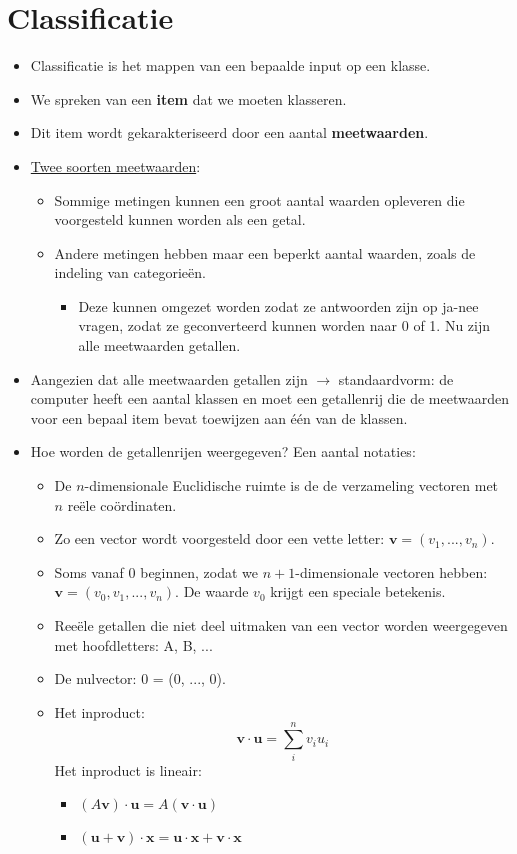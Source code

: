 \section{Classificatie}
\begin{itemize}
	\item Classificatie is het mappen van een bepaalde input op een klasse.
	\item We spreken van een \textbf{item} dat we moeten klasseren.
	\item Dit item wordt gekarakteriseerd door een aantal \textbf{meetwaarden}.
	\item \underline{Twee soorten meetwaarden}:
	\begin{itemize}
		\item Sommige metingen kunnen een groot aantal waarden opleveren die voorgesteld kunnen worden als een getal.
		\item Andere metingen hebben maar een beperkt aantal waarden, zoals de indeling van categorieën. 
		\begin{itemize}
			\item Deze kunnen omgezet worden zodat ze antwoorden zijn op ja-nee vragen, zodat ze geconverteerd kunnen worden naar 0 of 1.
			\good Nu zijn alle meetwaarden getallen.	
		\end{itemize}
	\end{itemize}
	\item Aangezien dat alle meetwaarden getallen zijn $\rightarrow$ standaardvorm: de computer heeft een aantal klassen en moet een getallenrij die de meetwaarden voor een bepaal item bevat toewijzen aan één van de klassen.
	\item Hoe worden de getallenrijen weergegeven? Een aantal notaties:
	\begin{itemize}
		\item De $n$-dimensionale Euclidische ruimte is de de verzameling vectoren met $n$ reële coördinaten.
		\item Zo een vector wordt voorgesteld door een vette letter: $\textbf{v} = (v_1, ..., v_n)$.
		\item Soms vanaf 0 beginnen, zodat we $n+1$-dimensionale vectoren hebben: $\textbf{v} = (v_0, v_1, ..., v_n)$. De waarde $v_0$ krijgt een speciale betekenis.
		\item Reeële getallen die niet deel uitmaken van een vector worden weergegeven met hoofdletters: A, B, ...
		\item De nulvector: 0 = (0, ..., 0).
		\item Het inproduct:
		$$\textbf{v}\cdot\textbf{u} = \sum_{i}^{n}v_iu_i$$
		Het inproduct is lineair:
		\begin{itemize}
			\item $(A\textbf{v})\cdot \textbf{u} = A(\textbf{v}\cdot\textbf{u})$
			\item $(\textbf{u} + \textbf{v})\cdot\textbf{x} = \textbf{u} \cdot \textbf{x} + \textbf{v} \cdot \textbf{x}$
		\end{itemize}


\end{itemize}
\end{itemize}
